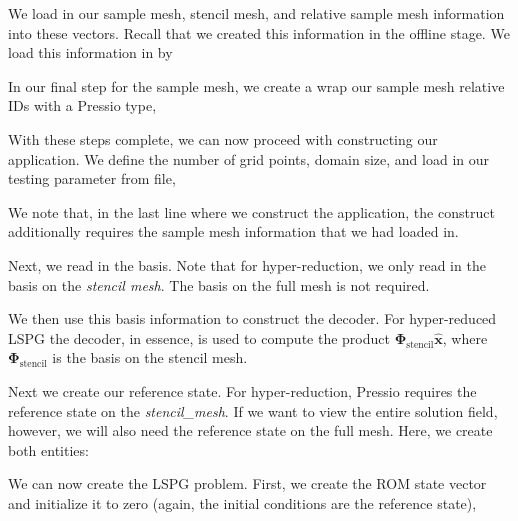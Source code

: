 We load in our sample mesh, stencil mesh, and relative sample mesh information into these vectors. Recall that we created this information in the offline stage. We load this information in by 
\begin{DoxyCode}{0}
\end{DoxyCode}


In our final step for the sample mesh, we create a wrap our sample mesh relative I\+Ds with a Pressio type, 
\begin{DoxyCode}{0}
\end{DoxyCode}


With these steps complete, we can now proceed with constructing our application. We define the number of grid points, domain size, and load in our testing parameter from file, 
\begin{DoxyCode}{0}
\end{DoxyCode}


We note that, in the last line where we construct the application, the construct additionally requires the sample mesh information that we had loaded in.

Next, we read in the basis. Note that for hyper-\/reduction, we only read in the basis on the {\itshape stencil mesh}. The basis on the full mesh is not required. 
\begin{DoxyCode}{0}
\end{DoxyCode}


We then use this basis information to construct the decoder. For hyper-\/reduced L\+S\+PG the decoder, in essence, is used to compute the product $\boldsymbol \Phi_{\text{stencil}} \hat{\boldsymbol x} $, where $\boldsymbol \Phi_{\text{stencil}}$ is the basis on the stencil mesh. 
\begin{DoxyCode}{0}
\end{DoxyCode}


Next we create our reference state. For hyper-\/reduction, Pressio requires the reference state on the {\itshape stencil\+\_\+mesh}. If we want to view the entire solution field, however, we will also need the reference state on the full mesh. Here, we create both entities\+: 
\begin{DoxyCode}{0}
\end{DoxyCode}


We can now create the L\+S\+PG problem. First, we create the R\+OM state vector and initialize it to zero (again, the initial conditions are the reference state), 
\begin{DoxyCode}{0}
\end{DoxyCode}



